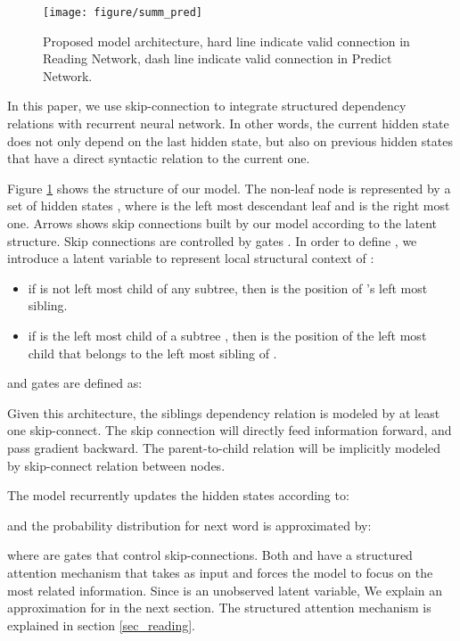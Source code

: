 \documentclass{article} \usepackage{iclr2018_conference,times}
\begin{document}
\begin{figure}[h]
  \centering  
  \texttt{[image: figure/summ\_pred]}
  \caption{Proposed model architecture, hard line indicate valid connection in Reading Network, dash line indicate valid connection in Predict Network.}
  \label{fig_summ_pred}
\end{figure}

In this paper, we use skip-connection to integrate structured dependency relations with recurrent neural network. In other words, the current hidden state does not only depend on the last hidden state, but also on previous hidden states that have a direct syntactic relation to the current one.


Figure \ref{fig_summ_pred} shows the structure of our model. The non-leaf node  is represented by a set of hidden states , where  is the left most descendant leaf and  is the right most one. Arrows shows skip connections built by our model according to the latent structure. Skip connections are controlled by gates . In order to define , we introduce a latent variable  to represent local structural context of :
\begin{itemize}
\item if  is not left most child of any subtree, then  is the position of 's left most sibling.
\item if  is the left most child of a subtree , then  is the position of the left most child that belongs to the left most sibling of . 
\end{itemize}
and gates are defined as:

Given this architecture, the siblings dependency relation is modeled by at least one skip-connect. The skip connection will directly feed information forward, and pass gradient backward. The parent-to-child relation will be implicitly modeled by skip-connect relation between nodes.


The model recurrently updates the hidden states according to:

and the probability distribution for next word is approximated by:

where  are gates that control skip-connections. Both  and  have a structured attention mechanism that takes  as input and forces the model to focus on the most related information. Since  is an unobserved latent variable, We explain an approximation for  in the next section. The structured attention mechanism is explained in section \ref{sec_reading}.
\end{document}
